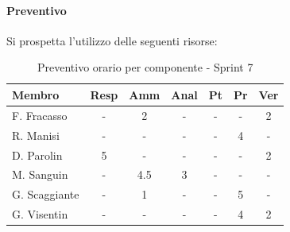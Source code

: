 \documentclass[a4paper,12pt]{article}
\begin{document}
\paragraph{Preventivo}
Si prospetta l'utilizzo delle seguenti risorse:

\begin{table}[H]
    \centering
    \renewcommand{\arraystretch}{1.3}
    \small 
    \begin{tabularx}{\textwidth}{|l|C|C|C|C|C|C|}
        \hline
        \textbf{Membro} & \textbf{Resp} & \textbf{Amm} & \textbf{Anal} & \textbf{Pt} & \textbf{Pr} & \textbf{Ver} \\
        \hline
        F. Fracasso & - & 2 & - & - & - & 2 \\
        \hline
        R. Manisi & - & - & - & - & 4 & - \\
        \hline
        D. Parolin & 5 & - & - & - & - & 2 \\
        \hline
        M. Sanguin & - & 4.5 & 3 & - & - & - \\
        \hline
        G. Scaggiante & - & 1 & - & - & 5 & - \\
        \hline
        G. Visentin & - & - & - & - & 4 & 2 \\
        \hline
    \end{tabularx}
    \caption{Preventivo orario per componente - Sprint 7}
    \label{tab:preventivo_sprint7}
\end{table}
\end{document}
